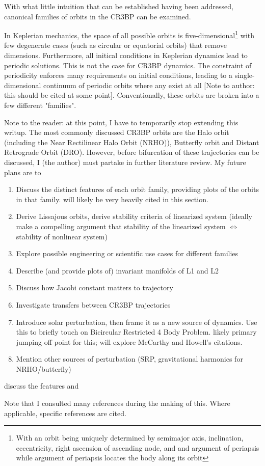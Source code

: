 \documentclass{article}
\begin{document}
With what little intuition that can be established having been addressed, canonical families of orbits in the CR3BP can be examined.

In Keplerian mechanics, the space of all possible orbits is five-dimensional\footnote[1]{With an orbit being uniquely determined by semimajor axis, inclination, eccentricity, right ascension of ascending node, and and argument of periapsis while argument of periapsis locates the body along its orbit} with few degenerate cases (such as circular or equatorial orbits) that remove dimensions. Furthermore, all initical conditions in Keplerian dynamics lead to periodic solutions\cite{BasicOrbitalDynamics}. This is not the case for CR3BP dynamics. The constraint of periodicity enforces many requirements on initial conditions, leading to a single-dimensional continuum of periodic orbits where any exist at all [Note to author: this should be cited at some point]. Conventionally, these orbits are broken into a few different "families".

Note to the reader: at this point, I have to temporarily stop extending this writup. The most commonly discussed CR3BP orbits are the Halo orbit (including the Near Rectilinear Halo Orbit (NRHO)), Butterfly orbit and Distant Retrograde Orbit (DRO). However, before bifurcation of these trajectories can be discussed, I (the author) must partake in further literature review. My future plans are to
\begin{enumerate}
    \item Discuss the distinct features of each orbit family, providing plots of the orbits in that family. \cite{Grebow} will likely be very heavily cited in this section.
    \item Derive Lissajous orbits, derive stability criteria of linearized system (ideally make a compelling argument that stability of the linearized system $\Leftrightarrow$ stability of nonlinear system)
    \item Explore possible engineering or scientific use cases for different families
    \item Describe (and provide plots of) invariant manifolds of L1 and L2
    \item Discuss how Jacobi constant matters to trajectory
    \item Investigate transfers between CR3BP trajectories
    \item Introduce solar perturbation, then frame it as a new source of dynamics. Use this to briefly touch on Bicircular Restricted 4 Body Problem. \cite{mccarthy_quasi-periodic_2022} likely primary jumping off point for this; will explore McCarthy and Howell's citations.
    \item Mention other sources of perturbation (SRP, gravitational harmonics for NRHO/butterfly)
\end{enumerate}
discuss the features and 

\newpage
Note that I consulted many references during the making of this. Where applicable, specific references are cited.
\nocite{*}
\end{document}
